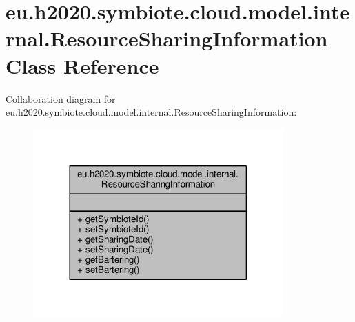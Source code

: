 \hypertarget{classeu_1_1h2020_1_1symbiote_1_1cloud_1_1model_1_1internal_1_1ResourceSharingInformation}{}\section{eu.\+h2020.\+symbiote.\+cloud.\+model.\+internal.\+Resource\+Sharing\+Information Class Reference}
\label{classeu_1_1h2020_1_1symbiote_1_1cloud_1_1model_1_1internal_1_1ResourceSharingInformation}


Collaboration diagram for eu.\+h2020.\+symbiote.\+cloud.\+model.\+internal.\+Resource\+Sharing\+Information\+:
\nopagebreak
\begin{figure}[H]
\begin{center}
\leavevmode
\includegraphics[width=272pt]{classeu_1_1h2020_1_1symbiote_1_1cloud_1_1model_1_1internal_1_1ResourceSharingInformation__coll__graph}
\end{center}
\end{figure}
